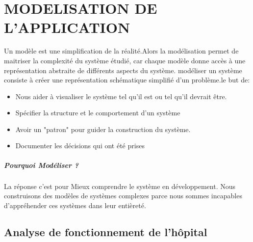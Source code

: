 \chapter{MODELISATION DE L'APPLICATION}
\minitoc
\newpage

	  Un modèle est une simplification de
	  la réalité.Alors la modélisation permet de maitriser
	  la complexité du système étudié,
	  car chaque modèle donne accès à
	  une représentation abstraite de
	  différents aspects du système.
	modéliser un système   consiste à créer une représentation schématique simplifié d'un problème.le but de:
	\begin{itemize}
\item Nous aider à visualiser le système tel qu'il est ou tel qu'il devrait être.
\item Spécifier la structure et le comportement d'un système
\item Avoir un "patron" pour guider la construction du système.
\item Documenter les décisions qui ont été prises
	\end{itemize}
	
	\paragraph{Pourquoi Modéliser ?}
	La réponse c'est pour Mieux comprendre le système en développement. Nous construisons des modèles de systèmes complexes parce nous sommes incapables d'appréhender ces systèmes dans leur entièreté.
	
	
	
	
	
	
	
	
	
	
	
	
	
	
	
	
	
	
	
	
	
	
	
	
	
	
	\newpage
	\section{Analyse de fonctionnement de l'hôpital}
	
